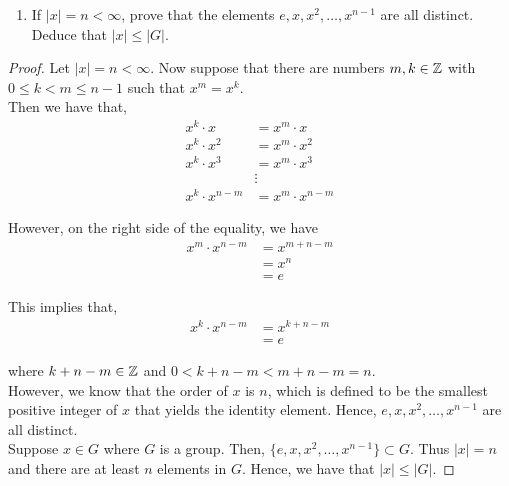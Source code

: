 \documentclass[11pt, reqno]{amsart}
\theoremstyle{plain}
\theoremstyle{definition}
\theoremstyle{example}
\begin{document}
\begin{enumerate}[1.]
\begin{enumerate}
\begin{proof}
Since $x^2 = xx = e$ and $y^2 = yy = e$, we have that $x = x^{-1}$ and $y = y^{-1}$. If $|xy| = 1$ or $|xy| = 2$, then $xy = (xy)^{-1}$ and
\begin{align*}
xy = (xy)^{-1} = y^{-1}x^{-1} = yx
\end{align*}

as required

\end{proof}

\item If $|x| = n < \infty$, prove that the elements $e, x, x^2, \dots, x^{n-1}$ are all distinct. Deduce that $|x| \leq |G|$. 
\end{enumerate}

\begin{proof}
Let $|x| = n < \infty$. Now suppose that there are numbers $m, k \in \mathbb{Z}$ with $0 \leq k < m \leq n-1$ such that $x^m = x^k$.\\

Then we have that,
\begin{align*}
x^k \cdot x &= x^m \cdot x\\
x^k \cdot x^2 &= x^m \cdot x^2\\
x^k \cdot x^3 &= x^m \cdot x^3\\
&\vdots\\
x^k \cdot x^{n-m} &= x^m \cdot x^{n-m}
\end{align*}

However, on the right side of the equality, we have
\begin{align*}
x^m \cdot x^{n-m} &= x^{m+n-m}\\
&= x^n\\
&= e
\end{align*}

This implies that,
\begin{align*}
x^k \cdot x^{n-m} &= x^{k+n-m}\\
&= e
\end{align*}

where $k+n-m \in \mathbb{Z}$ and $0 < k+n-m < m+n-m = n$.\\

However, we know that the order of $x$ is $n$, which is defined to be the smallest positive integer of $x$ that yields the identity element. Hence, $e, x, x^2, \dots, x^{n-1}$ are all distinct.\\

Suppose $x \in G$ where $G$ is a group. Then, $\{e, x, x^2, \dots, x^{n-1}\} \subset G$. Thus $|x| = n$ and there are at least $n$ elements in $G$. Hence, we have that $|x| \leq |G|$.
\end{proof}




\end{enumerate}
\end{document}
